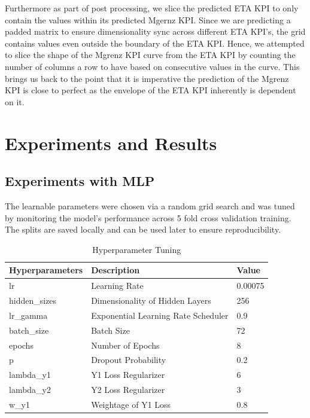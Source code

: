 \documentclass{report} %
\begin{document}
Furthermore as part of post processing, we slice the predicted ETA \ac{KPI} to only contain the values within its predicted Mgernz \ac{KPI}.
Since we are predicting a padded matrix to ensure dimensionality sync across different ETA \ac{KPI}'s, the grid contains values even outside the boundary of the ETA \ac{KPI}.
Hence, we attempted to slice the shape of the Mgrenz \ac{KPI} curve from the ETA \ac{KPI} by counting the number of columns a row to have based on consecutive values in the curve.
This brings us back to the point that it is imperative the prediction of the Mgrenz \ac{KPI} is close to perfect as the envelope of the ETA \ac{KPI} inherently is dependent on it.

\newpage 
\newpage 

\chapter{Experiments and Results}

\section{Experiments with \ac{MLP}}\label{sec:Experiments with MLP}

The learnable parameters were chosen via a random grid search  and was tuned by monitoring the model's performance across 5 fold cross validation training.\\
The splits are saved locally and can be used later to ensure reproducibility.

\begin{table}[H]
    \centering
    \begin{tabularx}{1\linewidth}{|X|X|X|}
    \hline {\bf Hyperparameters} & {\bf Description} & {\bf Value}\\
    \hline 
    lr & Learning Rate & 0.00075 \\
    hidden\_sizes & Dimensionality of Hidden Layers& 256 \\
    lr\_gamma & Exponential Learning Rate Scheduler & 0.9 \\
    batch\_size & Batch Size & 72 \\
    epochs & Number of Epochs & 8 \\
    p & Dropout Probability& 0.2 \\
    lambda\_y1 & Y1 Loss Regularizer & 6 \\
    lambda\_y2 & Y2 Loss Regularizer & 3 \\
    w\_y1 & Weightage of Y1 Loss & 0.8 \\
    \hline
    \end{tabularx}
    \caption{Hyperparameter Tuning}
    \label{tab:Hyperparameter Tunings}
\end{table}
\end{document}
